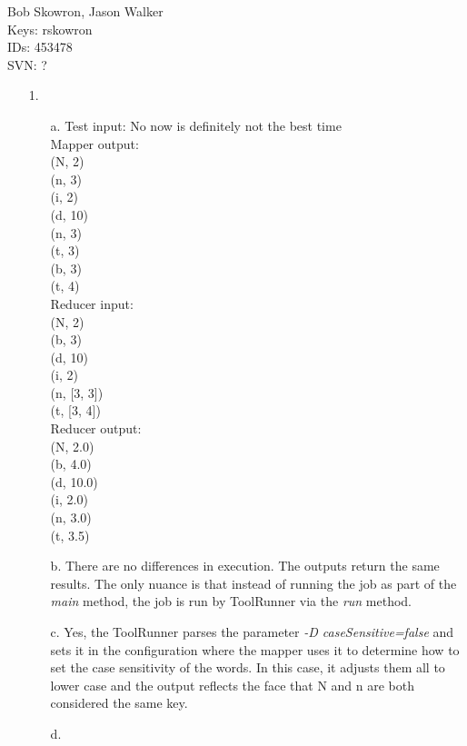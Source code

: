 \documentclass{article}
\begin{document}
\begin{flushright}
Bob Skowron, Jason Walker\\
Keys: rskowron\\
IDs: 453478\\
SVN: ?\\
\end{flushright}

\begin{itemize}
\item[1.] 
	\begin{itemize}
	\item[a.] Test input: No now is definitely not the best time \\
		Mapper output:\\
			(N, 2)\\
			(n, 3)\\
			(i, 2)\\
			(d, 10)\\
			(n, 3)\\
			(t, 3)\\
			(b, 3)\\
			(t, 4)\\
		Reducer input:\\
			(N, 2)\\
			(b, 3)\\
			(d, 10)\\
			(i, 2)\\
			(n, [3, 3])\\	
			(t, [3, 4])\\
		Reducer output:\\
			(N, 2.0)\\
			(b, 4.0)\\
			(d, 10.0)\\
			(i, 2.0)\\
			(n, 3.0)\\
			(t, 3.5)\\
	\item[b.] There are no differences in execution. The outputs return the same results. The only nuance is that instead of running the job as part of the \textit{main} method, the job is run by ToolRunner via the \textit{run} method.
	\item[c.] Yes, the ToolRunner parses the parameter \textit{-D caseSensitive=false} and sets it in the configuration where the mapper uses it to determine how to set the case sensitivity of the words. In this case, it adjusts them all to lower case and the output reflects the face that N and n are both considered the same key.
	\item[d.] %

\end{itemize}
\end{itemize}
\end{document}
